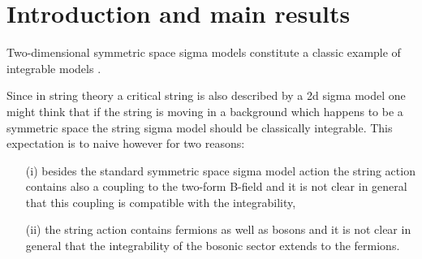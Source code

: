 \documentclass[a4paper,11pt]{article}
\begin{document}
\section{Introduction and main results}
Two-dimensional symmetric space sigma models constitute a classic example of integrable models \cite{Pohlmeyer:1975nb,Eichenherr:1979ci}. 
\iffalse
The action is
\begin{equation}
S=-\frac{g}{2}\int *e^a\wedge e^b\eta_{ab}
\end{equation}
where the target space is $G/H$ and its geometry is encoded in the Lie algebra valued Maurer-Cartan one-form 
\begin{equation}
J=g^{-1}dg=\tfrac12\omega^{ab}M_{ab}+e^aP_a\,,\qquad\mathfrak g=\mathrm{span}\{M_{ab},P_a\}\,,
\end{equation}
with the Lie algebra taking the form (\ref{eq:alg})
eom:
$\nabla*e^a=0$
\fi
Since in string theory a critical string is also described by a 2d sigma model one might think that if the string is moving in a background which happens to be a symmetric space the string sigma model should be classically integrable. This expectation is to naive however for two reasons: 
\begin{itemize}
	\item[(i)] besides the standard symmetric space sigma model action the string action contains also a coupling to the two-form B-field and it is not clear in general that this coupling is compatible with the integrability,
	\item[(ii)] the string action contains fermions as well as bosons and it is not clear in general that the integrability of the bosonic sector extends to the fermions.
\end{itemize}
\end{document}
